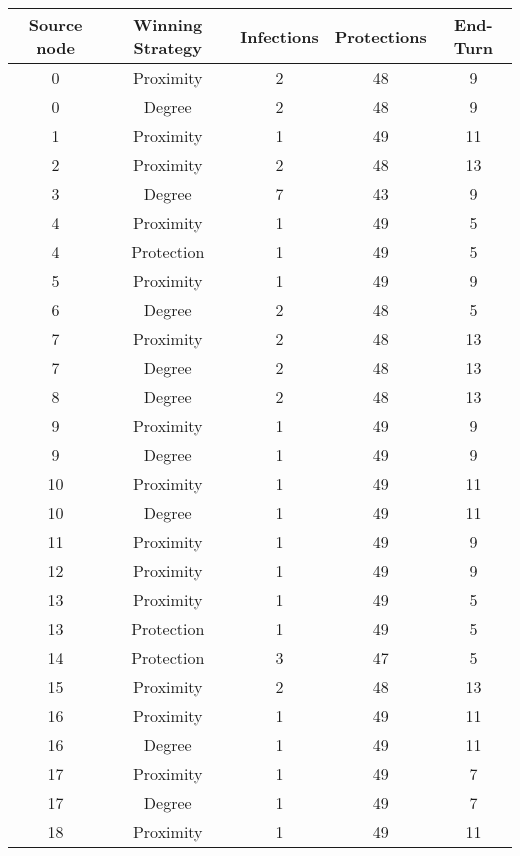 \documentclass[results.tex]{subfiles}
\begin{document}
\begin{center}
  \begin{tabular}{| c || c | c | c | c |}
    \hline
    {\bfseries Source node} & {\bfseries Winning Strategy} & {\bfseries Infections} & {\bfseries Protections} & {\bfseries End-Turn} \\  %
    \hline\hline
    0 & Proximity & 2 & 48 & 9 \\ 
    \hline
    0 & Degree & 2 & 48 & 9 \\ 
    \hline
    1 & Proximity & 1 & 49 & 11 \\ 
    \hline
    2 & Proximity & 2 & 48 & 13 \\ 
    \hline
    3 & Degree & 7 & 43 & 9 \\ 
    \hline
    4 & Proximity & 1 & 49 & 5 \\ 
    \hline
    4 & Protection & 1 & 49 & 5 \\ 
    \hline
    5 & Proximity & 1 & 49 & 9 \\ 
    \hline
    6 & Degree & 2 & 48 & 5 \\ 
    \hline
    7 & Proximity & 2 & 48 & 13 \\ 
    \hline
    7 & Degree & 2 & 48 & 13 \\ 
    \hline
    8 & Degree & 2 & 48 & 13 \\ 
    \hline
    9 & Proximity & 1 & 49 & 9 \\ 
    \hline
    9 & Degree & 1 & 49 & 9 \\ 
    \hline
    10 & Proximity & 1 & 49 & 11 \\ 
    \hline
    10 & Degree & 1 & 49 & 11 \\ 
    \hline
    11 & Proximity & 1 & 49 & 9 \\ 
    \hline
    12 & Proximity & 1 & 49 & 9 \\ 
    \hline
    13 & Proximity & 1 & 49 & 5 \\ 
    \hline
    13 & Protection & 1 & 49 & 5 \\ 
    \hline
    14 & Protection & 3 & 47 & 5 \\ 
    \hline
    15 & Proximity & 2 & 48 & 13 \\ 
    \hline
    16 & Proximity & 1 & 49 & 11 \\ 
    \hline
    16 & Degree & 1 & 49 & 11 \\ 
    \hline
    17 & Proximity & 1 & 49 & 7 \\ 
    \hline
    17 & Degree & 1 & 49 & 7 \\ 
    \hline
    18 & Proximity & 1 & 49 & 11 \\ 

\end{tabular}
\end{center}
\end{document}
